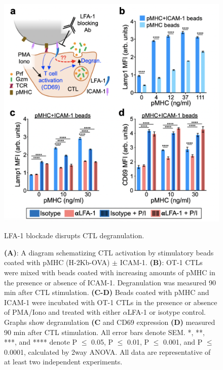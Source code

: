\begin{figure}[htbp]
	\centering
	\includegraphics[width=1.0\columnwidth]{../figures/chapter3/fig1suppbeads.png}
	\caption{LFA-1 blockade disrupts CTL degranulation.}
	\caption*{\textbf{(A)}: A diagram schematizing CTL activation by stimulatory beads coated with pMHC (H-2Kb-OVA) $\pm$ ICAM-1. \textbf{(B)}: OT-1 CTLs were mixed with beads coated with increasing amounts of pMHC in the presence or absence of ICAM-1. Degranulation was measured 90 min after CTL stimulation. \textbf{(C-D)} Beads coated with pMHC and ICAM-1 were incubated with OT-1 CTLs in the presence or absence of PMA/Iono and treated with either $\alpha$LFA-1 or isotype control. Graphs show degranulation \textbf{(C} and CD69 expression \textbf{(D)} measured 90 min after CTL stimulation. All error bars denote SEM. *, **, ***, and **** denote P $\leq$ 0.05, P $\leq$ 0.01, P $\leq$ 0.001, and P $\leq$ 0.0001, calculated by 2way ANOVA. All data are representative of at least two independent experiments.}
	\label{fig:fig1suppbeads}
\end{figure} 
 
